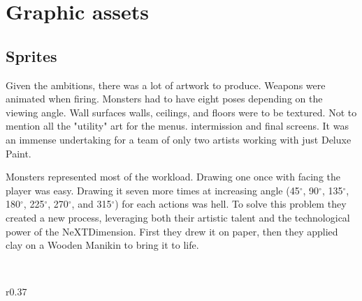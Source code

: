 \section{Graphic assets}
\subsection{Sprites}
Given the ambitions, there was a lot of artwork to produce. Weapons were animated when firing. Monsters had to have eight poses depending on the viewing angle. Wall surfaces walls, ceilings, and floors were to be textured. Not to mention all the "utility" art for the menus. intermission and final screens. It was an immense undertaking for a team of only two artists working with just Deluxe Paint.\\
\par
Monsters represented most of the workload. Drawing one once with facing the player was easy. Drawing it seven more times at increasing angle (45$^{\circ}$, 90$^{\circ}$, 135$^{\circ}$, 180$^{\circ}$, 225$^{\circ}$, 270$^{\circ}$, and 315$^{\circ}$) for each actions was hell. To solve this problem they created a new process, leveraging both their artistic talent and the technological power of the NeXTDimension. First they drew it on paper, then they applied clay on a Wooden Manikin to bring it to life.\\
\par


\\


\begin{wrapfigure}[8]{r}{0.37\textwidth}
\centering
{}
\end{wrapfigure}


